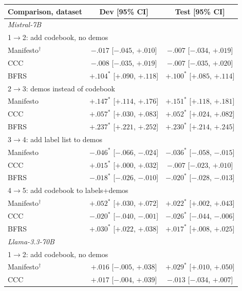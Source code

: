 \documentclass[11pt]{article}
\begin{document}
\begin{table}[!htp]
\centering
\begin{tabular}{lcc}
\toprule
Comparison, dataset & Dev [95\% CI] & Test [95\% CI] \\
\midrule
\multicolumn{3}{l}{\emph{Mistral-7B}} \\
\multicolumn{3}{l}{1$\rightarrow$2: add codebook, no demos} \\
\quad Manifesto$^\dagger$ & $-.017$ [$-.045$, $+.010$] & $-.007$ [$-.034$, $+.019$] \\
\quad CCC & $-.008$ [$-.035$, $+.019$] & $-.007$ [$-.035$, $+.020$] \\
\quad BFRS & $+.104^*$ [$+.090$, $+.118$] & $+.100^*$ [$+.085$, $+.114$] \\
\multicolumn{3}{l}{2$\rightarrow$3: demos instead of codebook} \\
\quad Manifesto & $+.147^*$ [$+.114$, $+.176$] & $+.151^*$ [$+.118$, $+.181$] \\
\quad CCC & $+.057^*$ [$+.030$, $+.083$] & $+.052^*$ [$+.024$, $+.082$] \\
\quad BFRS & $+.237^*$ [$+.221$, $+.252$] & $+.230^*$ [$+.214$, $+.245$] \\
\multicolumn{3}{l}{3$\rightarrow$4: add label list to demos} \\
\quad Manifesto & $-.046^*$ [$-.066$, $-.024$] & $-.036^*$ [$-.058$, $-.015$] \\
\quad CCC & $+.015^*$ [$+.000$, $+.032$] & $-.007$ [$-.023$, $+.010$] \\
\quad BFRS & $-.018^*$ [$-.026$, $-.010$] & $-.020^*$ [$-.028$, $-.013$] \\
\multicolumn{3}{l}{4$\rightarrow$5: add codebook to labels+demos} \\
\quad Manifesto$^\dagger$ & $+.052^*$ [$+.030$, $+.072$] & $+.022^*$ [$+.002$, $+.043$] \\
\quad CCC & $-.020^*$ [$-.040$, $-.001$] & $-.026^*$ [$-.044$, $-.006$] \\
\quad BFRS & $+.030^*$ [$+.022$, $+.038$] & $+.017^*$ [$+.008$, $+.025$] \\
\midrule
\multicolumn{3}{l}{\emph{Llama-3.3-70B}} \\
\multicolumn{3}{l}{1$\rightarrow$2: add codebook, no demos} \\
\quad Manifesto$^\dagger$ & $+.016$ [$-.005$, $+.038$] & $+.029^*$ [$+.010$, $+.050$] \\
\quad CCC & $+.017$ [$-.004$, $+.039$] & $-.013$ [$-.034$, $+.007$] \\

\end{tabular}
\end{table}
\end{document}

